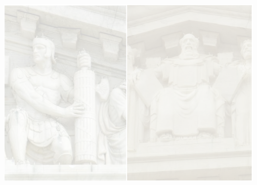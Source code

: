 



\usebackgroundtemplate%
{%
    \includegraphics[width=\paperwidth,height=\paperheight]{img/supcourt-facade-background.png}%
}



%
%
%


